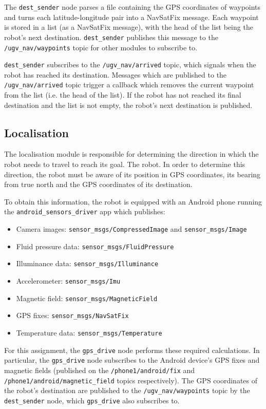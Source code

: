 \documentclass[titlepage,12pt,a4paper]{article}
\begin{document}
The \verb|dest_sender| node parses a file containing the GPS coordinates of waypoints and turns each latitude-longitude pair into a NavSatFix message. Each waypoint is stored in a list (as a NavSatFix message), with the head of the list being the robot's next destination. \verb|dest_sender| publishes this message to the \verb|/ugv_nav/waypoints| topic for other modules to subscribe to.

\verb|dest_sender| subscribes to the \verb|/ugv_nav/arrived| topic, which signals when the robot has reached its destination. Messages which are published to the \verb|/ugv_nav/arrived| topic trigger a callback which removes the current waypoint from the list (i.e. the head of the list). If the robot has not reached its final destination and the list is not empty, the robot's next destination is published.

\pagebreak

\subsection{Localisation}
The localisation module is responsible for determining the direction in which the robot needs to travel to reach its goal. The robot. In order to determine this direction, the robot must be aware of its position in GPS coordinates, its bearing from true north and the GPS coordinates of its destination.

To obtain this information, the robot is equipped with an Android phone running the \verb|android_sensors_driver| app which publishes:

\begin{itemize}
	\item Camera images: \verb|sensor_msgs/CompressedImage| and \verb|sensor_msgs/Image|
	\item Fluid pressure data: \verb|sensor_msgs/FluidPressure|
	\item Illuminance data: \verb|sensor_msgs/Illuminance|
	\item Accelerometer: \verb|sensor_msgs/Imu|
	\item Magnetic field: \verb|sensor_msgs/MagneticField|
	\item GPS fixes: \verb|sensor_msgs/NavSatFix|
	\item Temperature data: \verb|sensor_msgs/Temperature| \\
\end{itemize}

For this assignment, the \verb|gps_drive| node performs these required calculations. In particular, the \verb|gps_drive| node subscribes to the Android device's GPS fixes and magnetic fields (published on the \verb|/phone1/android/fix| and \verb|/phone1/android/magnetic_field| topics respectively). The GPS coordinates of the robot's destination are published to the  \verb|/ugv_nav/waypoints| topic by the \verb|dest_sender| node, which \verb|gps_drive| also subscribes to.
\end{document}
